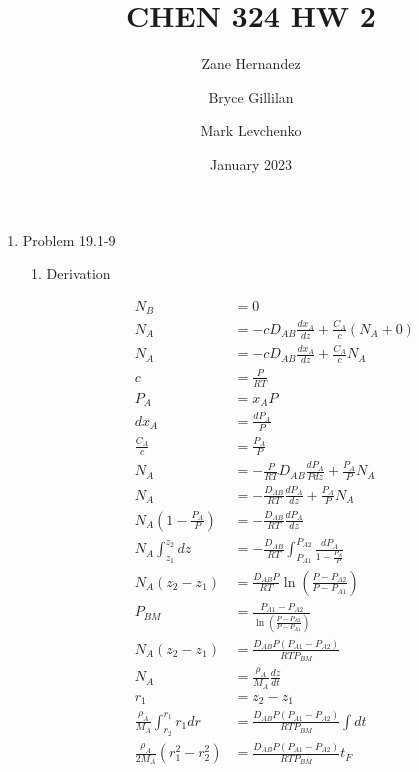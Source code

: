 \documentclass[12pt]{article}
\title{CHEN 324 HW 2}
\author[1]{Zane Hernandez}
\author[2]{Bryce Gillilan}
\author[3]{Mark Levchenko}
\affil[1,2,3]{Group 11}
\date{January 2023}
\begin{document}
\maketitle
\newpage


\begin{enumerate}

    \item Problem 19.1-9
    \begin{enumerate}
        \item Derivation

        \begin{align*}
            N_B &= 0 \\
            N_A &= -c D_{AB} \frac{d x_A}{d z} + \frac{C_A}{c} (N_A + 0) \\
            N_A &= -c D_{AB} \frac{d x_A}{d z} + \frac{C_A}{c} N_A \\
            c &= \frac{P}{R T} \\
            P_A &= x_A P \\
            d x_A &= \frac{d P_A}{P} \\
            \frac{C_A}{c} &= \frac{P_A}{P} \\
            N_A &= -\frac{P}{R T} D_{AB} \frac{d P_A}{P d z} + \frac{P_A}{P} N_A \\
            N_A &= -\frac{D_{AB}}{R T} \frac{d P_A}{d z} + \frac{P_A}{P} N_A \\
            N_A \left(1 - \frac{P_A}{P} \right) &= -\frac{D_{AB}}{R T} \frac{d P_A}{d z} \\
            N_A \int_{z_1}^{z_2} dz  &= -\frac{D_{AB}}{R T} \int_{P_{A1}}^{P_{A2}} \frac{d P_A}{1 - \frac{P_A}{P}} \\
            N_A (z_2 - z_1) &= \frac{D_{AB} P}{R T} \ln{\left( \frac{P - P_{A2}}{P - P_{A1}} \right)} \\
            P_{BM} &= \frac{P_{A1} - P_{A2}}{\ln\left( \frac{P-P_{A2}}{P-P_{A1}} \right)} \\
            N_A (z_2 - z_1) &= \frac{D_{AB} P (P_{A1} - P_{A2})}{R T P_{BM}}  \\
            N_A &= \frac{\rho_A}{M_A} \frac{dz}{dt} \\
            r_1 &= z_2 - z_1 \\
            \frac{\rho_A}{M_A} \int_{r_2}^{r_1} r_1 dr &= \frac{D_{AB} P (P_{A1} - P_{A2})}{R T P_{BM}}  \int dt \\
            \frac{\rho_A}{2 M_A} (r_1^2 - r_2^2) &= \frac{D_{AB} P (P_{A1} - P_{A2})}{R T P_{BM}}  t_F \\

\end{align*}
\end{enumerate}
\end{enumerate}
\end{document}
